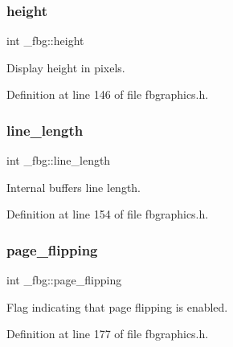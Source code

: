\mbox{\label{struct__fbg_a3a3bd409e71d020fa77f69a541d832f8}} 
\subsubsection{\texorpdfstring{height}{height}}
{\footnotesize\ttfamily int \+\_\+fbg\+::height}



Display height in pixels. 



Definition at line 146 of file fbgraphics.\+h.

\mbox{\label{struct__fbg_af8a1ee8d7004e6f2193f2a3ed98f8ce8}} 
\subsubsection{\texorpdfstring{line\+\_\+length}{line\_length}}
{\footnotesize\ttfamily int \+\_\+fbg\+::line\+\_\+length}



Internal buffers line length. 



Definition at line 154 of file fbgraphics.\+h.

\mbox{\label{struct__fbg_ad32509bca6ac4fb467476834cb8ce9d2}} 
\subsubsection{\texorpdfstring{page\+\_\+flipping}{page\_flipping}}
{\footnotesize\ttfamily int \+\_\+fbg\+::page\+\_\+flipping}



Flag indicating that page flipping is enabled. 



Definition at line 177 of file fbgraphics.\+h.

\mbox{\label{struct__fbg_a84fb220d4804cba22176997898e75b73}} 
